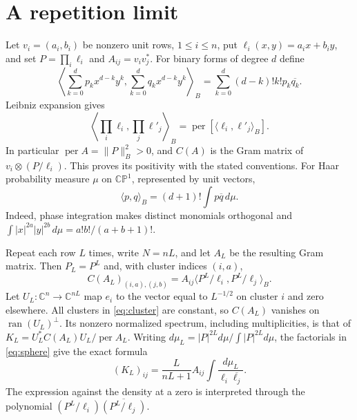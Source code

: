 \documentclass[11pt]{article}
\DeclareMathOperator{\per}{per}
\newcommand{\CP}{\mathbb{CP}}
\begin{document}
\section{A repetition limit}
Let $v_i=(a_i,b_i)$ be nonzero unit rows, $1\le i\le n$, put
$\ell_i(x,y)=a_i x+b_i y$, and set $P=\prod_i\ell_i$ and $A_{ij}=v_i v_j^*$.
For binary forms of degree $d$ define
\[
 \left\langle\sum_{k=0}^d p_kx^{d-k}y^k,
 \sum_{k=0}^d q_kx^{d-k}y^k\right\rangle_B
 =\sum_{k=0}^d(d-k)!k!p_k\overline{q_k}.
\]
Leibniz expansion gives
\begin{equation}\label{eq:gram}
 \left\langle\prod_i\ell_i,\prod_j\ell'_j\right\rangle_B
 =\per[\langle\ell_i,\ell'_j\rangle_B].
\end{equation}
In particular $\per A=\|P\|_B^2>0$, and $C(A)$ is the Gram matrix of
$v_i\otimes(P/\ell_i)$. This proves its positivity with the stated conventions.
For Haar probability measure $\mu$ on $\CP^1$, represented by unit vectors,
\begin{equation}\label{eq:sphere}
 \langle p,q\rangle_B=(d+1)!\int p\overline q\,d\mu.
\end{equation}
Indeed, phase integration makes distinct monomials orthogonal and
$\int|x|^{2a}|y|^{2b}\,d\mu=a!b!/(a+b+1)!$.

Repeat each row $L$ times, write $N=nL$, and let $A_L$ be the resulting Gram
matrix. Then $P_L=P^L$ and, with cluster indices $(i,a)$,
\begin{equation}\label{eq:cluster}
 C(A_L)_{(i,a),(j,b)}
 =A_{ij}\langle P^L/\ell_i,P^L/\ell_j\rangle_B.
\end{equation}
Let $U_L:\mathbb C^n\to\mathbb C^{nL}$ map $e_i$ to the vector equal to
$L^{-1/2}$ on cluster $i$ and zero elsewhere. All clusters in \eqref{eq:cluster}
are constant, so $C(A_L)$ vanishes on $\operatorname{ran}(U_L)^\perp$.
Its nonzero normalized spectrum, including multiplicities, is that of
$K_L=U_L^*C(A_L)U_L/\per A_L$.
Writing $d\mu_L=|P|^{2L}d\mu/\int|P|^{2L}d\mu$, the factorials in
\eqref{eq:sphere} give the exact formula
\begin{equation}\label{eq:compression}
 (K_L)_{ij}=\frac{L}{nL+1}A_{ij}
       \int\frac{d\mu_L}{\ell_i\overline{\ell_j}}.
\end{equation}
The expression against the density at a zero is interpreted through the
polynomial $(P^L/\ell_i)\overline{(P^L/\ell_j)}$.
\end{document}
